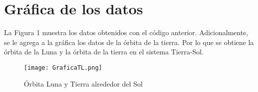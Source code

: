 \documentclass{article}
\begin{document}
\section{Gráfica de los datos}
La Figura 1 muestra los datos obtenidos con el código anterior. Adicionalmente, se le agrega a la gráfica los datos de la órbita de la tierra. Por lo que se obtiene la órbita de la Luna y la órbita de la tierra en el sistema Tierra-Sol.

\begin{figure}
    \texttt{[image: GraficaTL.png]}
    \caption{Órbita Luna y Tierra alrededor del Sol}
    \end{figure}
\end{document}
